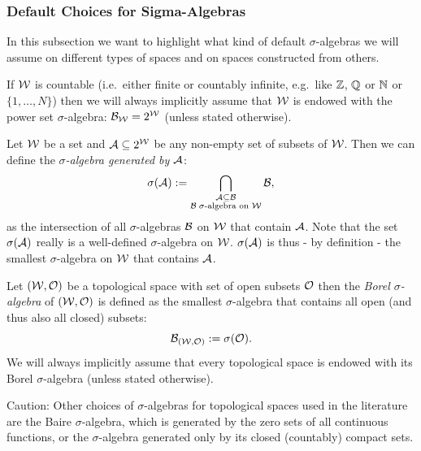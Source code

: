 \subsubsection{Default Choices for Sigma-Algebras}


In this subsection we want to highlight what kind of default $\sigma$-algebras we will assume 
on different types of spaces and on spaces constructed from others.

\begin{Rem}
    If $\mathcal{W}$ is countable (i.e.\ either finite or countably infinite, e.g.\ like $\mathbb{Z}$, $\mathbb{Q}$ or  $\mathbb{N}$ or $\{1,\dots,N\}$) 
    then we will always implicitly assume that $\mathcal{W}$ is endowed with the power set $\sigma$-algebra: $\mathcal{B}_{\mathcal{W}} = 2^{\mathcal{W}}$ (unless stated otherwise).
\end{Rem}


\begin{Def}
    \label{def-sigma-algebra-gen}
    Let $\mathcal{W}$ be a set and $\mathcal{A} \subseteq 2^{\mathcal{W}}$ be any non-empty set of subsets of $\mathcal{W}$.
    Then we can define the \emph{$\sigma$-algebra generated by $\mathcal{A}$}:
    \[ \sigma(\mathcal{A}) := \bigcap_{\substack{ \mathcal{A} \subseteq \mathcal{B} \\\mathcal{B}\; \sigma\text{-algebra on }\mathcal{W} }} \mathcal{B}, \]
    as the intersection of all $\sigma$-algebras $\mathcal{B}$ on $\mathcal{W}$ that contain $\mathcal{A}$. 
    Note that the set $\sigma(\mathcal{A})$ really is a well-defined $\sigma$-algebra on $\mathcal{W}$. %
    $\sigma(\mathcal{A})$ is thus - by definition - the smallest $\sigma$-algebra on $\mathcal{W}$ that contains $\mathcal{A}$.
\end{Def}


\begin{Def}
    Let $(\mathcal{W},\mathcal{O})$ be a topological space with set of open subsets $\mathcal{O}$ then the \emph{Borel $\sigma$-algebra} of $(\mathcal{W},\mathcal{O})$ is 
    defined as the smallest $\sigma$-algebra that contains all open (and thus also all closed) subsets:
    \[ \mathcal{B}_{(\mathcal{W},\mathcal{O})} := \sigma(\mathcal{O}).\]
    We will always implicitly assume that every topological space is endowed with its Borel $\sigma$-algebra (unless stated otherwise).
\end{Def}

\begin{Rem}
    Caution: Other choices of $\sigma$-algebras for topological spaces used in the literature are the Baire $\sigma$-algebra, which is generated by the zero sets of all continuous functions, or the $\sigma$-algebra generated only by its closed (countably) compact sets.
\end{Rem}

